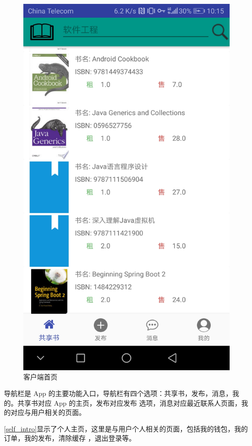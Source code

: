 	\begin{figure}[h]
		\centering
		\includegraphics[scale=0.09]{Chapters/UI/book_list.jpg}
		\caption{客户端首页}
		\label{main_ui}
	\end{figure}

	导航栏是 App 的主要功能入口，导航栏有四个选项：共享书，发布，消息，我的。共享书对应 App 的主页，发布对应发布
	选项，消息对应最近联系人页面，我的对应与用户相关的页面。

\cref{self_intro}显示了个人主页，这里是与用户个人相关的页面，包括我的钱包，我的订单，我的发布，清除缓存 ，退出登录等。

